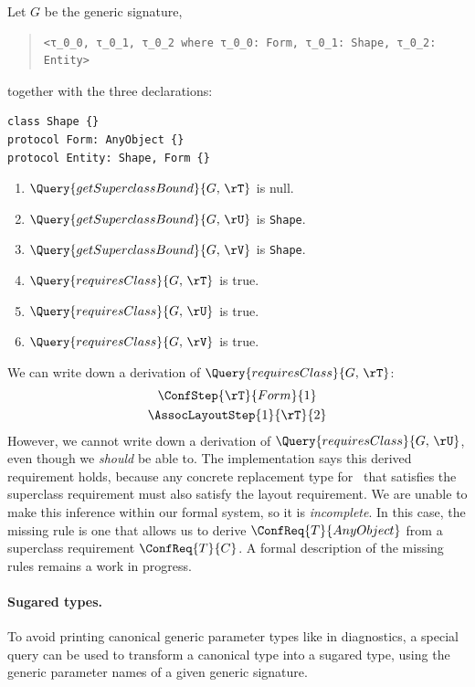 \documentclass[../generics]{subfiles}
\begin{document}
\begin{example}
Let $G$ be the generic signature,
\begin{quote}
\begin{verbatim}
<τ_0_0, τ_0_1, τ_0_2 where τ_0_0: Form, τ_0_1: Shape, τ_0_2: Entity>
\end{verbatim}
\end{quote}
together with the three declarations:
\begin{Verbatim}
class Shape {}
protocol Form: AnyObject {}
protocol Entity: Shape, Form {}
\end{Verbatim}

\begin{enumerate}
\item $\Query{getSuperclassBound}{G,\,\texttt{\rT}}$ is null.
\item $\Query{getSuperclassBound}{G,\,\texttt{\rU}}$ is \texttt{Shape}.
\item $\Query{getSuperclassBound}{G,\,\texttt{\rV}}$ is \texttt{Shape}.
\item $\Query{requiresClass}{G,\,\texttt{\rT}}$ is true.
\item $\Query{requiresClass}{G,\,\texttt{\rU}}$ is true.
\item $\Query{requiresClass}{G,\,\texttt{\rV}}$ is true.
\end{enumerate}
We can write down a derivation of $\Query{requiresClass}{G,\,\texttt{\rT}}$:
\begin{gather*}
\ConfStep{\rT}{Form}{1}\\
\AssocLayoutStep{1}{\rT}{2}
\end{gather*}
However, we cannot write down a derivation of $\Query{requiresClass}{G,\,\texttt{\rU}}$, even though we \emph{should} be able to. The implementation says this derived requirement holds, because any concrete replacement type for \rU\ that satisfies the superclass requirement must also satisfy the layout requirement. We are unable to make this inference within our formal system, so it is \emph{incomplete}. In this case, the missing rule is one that allows us to derive $\ConfReq{T}{AnyObject}$ from a superclass requirement $\ConfReq{T}{C}$. A formal description of the missing rules remains a work in progress.
\end{example}

\paragraph{Sugared types.} To avoid printing canonical generic parameter types like  in diagnostics, a special query can be used to transform a canonical type into a sugared type, using the generic parameter names of a given generic signature.
\end{document}
